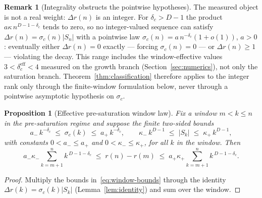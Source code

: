 \documentclass[11pt,a4paper]{article}
\newtheorem{proposition}[theorem]{Proposition}
\theoremstyle{definition}
\newtheorem{remark}[theorem]{Remark}
\newcommand{\dc}{\delta_c}
\begin{document}
\begin{remark}[Integrality obstructs the pointwise hypotheses]
  \label{rem:integrality}
  The measured object is not a real weight: $\Delta r(n)$ is an integer.
  For $\dc > D - 1$ the product $a\kappa\, n^{D-1-\dc}$ tends to zero, so no integer-valued sequence can
  satisfy $\Delta r(n) = \sigma_c(n)|S_n|$ with a pointwise law $\sigma_c(n) = a\,n^{-\dc}(1+o(1))$,
  $a > 0$: eventually either $\Delta r(n) = 0$ exactly --- forcing $\sigma_c(n) = 0$ --- or
  $\Delta r(n) \ge 1$ --- violating the decay.
  This range includes the window-effective values $3 < \dc^{\mathrm{eff}} < 4$ measured on the growth
  branch (Section~\ref{sec:numerics}), not only the saturation branch.
  Theorem~\ref{thm:classification} therefore applies to the integer rank only through the finite-window
  formulation below, never through a pointwise asymptotic hypothesis on $\sigma_c$.
\end{remark}

\begin{proposition}[Effective pre-saturation window law]
  \label{prop:window}
  Fix a window $m < k \le n$ in the pre-saturation regime and suppose the finite two-sided bounds
  \begin{equation}
    \label{eq:window-bounds}
    a_-\, k^{-\dc} \;\le\; \sigma_c(k) \;\le\; a_+\, k^{-\dc},
    \qquad
    \kappa_-\, k^{D-1} \;\le\; |S_k| \;\le\; \kappa_+\, k^{D-1},
  \end{equation}
  with constants $0 < a_- \le a_+$ and $0 < \kappa_- \le \kappa_+$, for all $k$ in the window.
  Then
  \begin{equation}
    \label{eq:window-law}
    a_-\kappa_- \sum_{k=m+1}^{n} k^{\,D-1-\dc}
    \;\le\; r(n) - r(m) \;\le\;
    a_+\kappa_+ \sum_{k=m+1}^{n} k^{\,D-1-\dc}.
  \end{equation}
\end{proposition}

\begin{proof}
  Multiply the bounds in~\eqref{eq:window-bounds} through the identity $\Delta r(k) = \sigma_c(k)|S_k|$
  (Lemma~\ref{lem:identity}) and sum over the window.
\end{proof}
\end{document}
